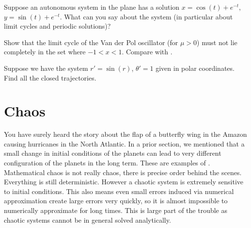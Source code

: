 \documentclass[12pt]{book}
\begin{document}
\begin{exercise}
Suppose an autonomous system in the plane has a solution
$x=\cos(t)+e^{-t}$, $y=\sin(t)+e^{-t}$.  What can you say
about the system (in particular about limit cycles and periodic solutions)?
\end{exercise}

\begin{exercise}
Show that the limit cycle
of the 
Van der Pol oscillator (for $\mu > 0$) must not lie completely in the set
where 
$-1 < x < 1$.
Compare with .
\end{exercise}

\begin{exercise}
Suppose we have the system $r' = \sin(r)$, $\theta' = 1$ given
in polar coordinates.  Find all the closed trajectories.
\end{exercise}



\sectionnewpage
\section{Chaos} \label{sec:chaos}


You have surely heard the story about the
flap of a butterfly wing in the Amazon causing hurricanes in the North
Atlantic.  In a prior section, we mentioned that a small change in
initial conditions of the planets can lead to very different configuration
of the planets in the long term.  These are examples of
\emph{}.
Mathematical chaos is not really chaos, there is precise order behind the
scenes.  Everything is still deterministic.  However a chaotic system is extremely
sensitive to initial conditions.  This also means even small errors induced 
via numerical approximation create large errors very quickly, so it is
almost impossible to numerically approximate for long times.
This is large part of
the trouble as chaotic systems cannot be in general solved analytically.
\end{document}
